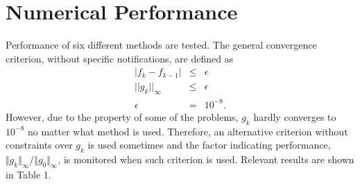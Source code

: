 \documentclass[11pt,a4paper]{article}
\begin{document}
\section{Numerical Performance}

Performance of six different methods are tested. The general convergence criterion, without specific notifications, are defined as
\begin{eqnarray*}
  |f_{k} - f_{k-1}| & \le & \epsilon \\
  ||g_{k}||_{\infty} & \le & \epsilon \\
  \epsilon & = & 10^{-8}.
\end{eqnarray*}
However, due to the property of some of the problems, $g_k$ hardly converges to $10^{-8}$ no matter what method is used. Therefore, an alternative criterion without constraints over $g_k$ is used sometimes and the factor indicating performance, $\Vert g_k \Vert_{\infty} / \Vert g_0 \Vert_{\infty}$, is monitored when such criterion is used. Relevant results are shown in Table 1.
\end{document}
